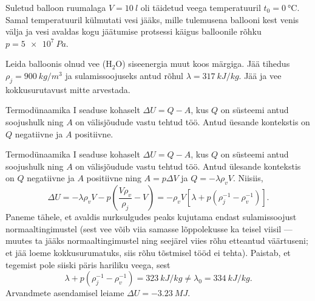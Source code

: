 
Suletud balloon ruumalaga $V = \SI{10}{l}$ oli täidetud veega temperatuuril $t_0 = \SI{0}{\degreeCelsius}$. Samal temperatuuril külmutati vesi jääks, mille tulemusena ballooni kest venis välja ja vesi avaldas kogu jäätumise protsessi käigus balloonile rõhku $p = \SI{5e7}{Pa}$.

Leida balloonis olnud vee ($\mathrm{H_2O}$) siseenergia muut koos märgiga. Jää tihedus $\rho_j = \SI{900}{kg/m^3}$ ja sulamissoojuseks antud rõhul $\lambda = \SI{317}{kJ/kg}$. Jää ja vee kokkusurutavust mitte arvestada. 

\hint
Termodünaamika I seaduse kohaselt $\Delta U = Q - A$, kus $Q$ on süsteemi antud soojushulk ning $A$ on välisjõudude vastu tehtud töö. Antud üesande kontekstis on $Q$ negatiivne ja $A$ positiivne.

\solu
Termodünaamika I seaduse kohaselt $\Delta U = Q - A$, kus $Q$ on süsteemi antud soojushulk ning $A$ on välisjõudude vastu tehtud töö. Antud ülesande kontekstis on $Q$ negatiivne ja $A$ positiivne ning $A = p\Delta V$ ja $Q = -\lambda \rho_vV$. Niisiis,
\[
\Delta U=-\lambda \rho_{v} V-p\left(\frac{V \rho_{v}}{\rho_{j}}-V\right)=-\rho_{v} V\left[\lambda+p\left(\rho_{j}^{-1}-\rho_{v}^{-1}\right)\right].
\]
Paneme tähele, et avaldis nurksulgudes peaks kujutama endast sulamissoojust normaaltingimustel (sest vee võib viia samasse lõppolekusse ka teisel viisil --- muutes ta jääks normaaltingimustel ning seejärel viies rõhu etteantud väärtuseni; et jää loeme kokkusurumatuks, siis rõhu tõstmisel tööd ei tehta). Paistab, et tegemist pole siiski päris hariliku veega, sest
\[
\lambda+p\left(\rho_{j}^{-1}-\rho_{v}^{-1}\right)= \SI{323}{kJ/kg} \neq \lambda_{0}=\SI{334}{kJ/kg}.
\]
Arvandmete asendamisel leiame $\Delta U = \SI{-3,23}{MJ}$.
\probend